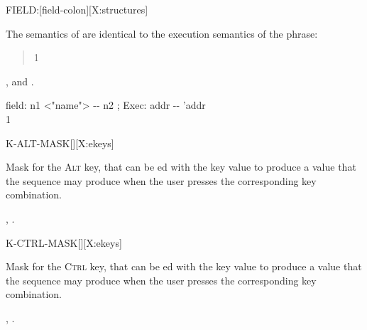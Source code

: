 \begin{worddef}{}{FIELD:}[field-colon][X:structures]
\item \stack{}{}

	The semantics of  are identical to the
	execution semantics of the phrase:
	\begin{quote}\ttfamily
		 1  
	\end{quote}

\see {},
	 and
	.

	\begin{defer}
	\implementation

		\word{:} field:\tab{} n1 <"name"> -{}- n2 ; Exec: addr -{}- 'addr \\
		\tab {} 1   \\
		\word{;}
	\end{defer}

\end{worddef}


\begin{worddef}{}{K-ALT-MASK}[][X:ekeys]
\item {}

	Mask for the \textsc{Alt} key, that can be ed with the
	key value to produce a value that the sequence 
	 may produce when the user presses the
	corresponding key combination.

\see {},
	.
\end{worddef}


\begin{worddef}{}{K-CTRL-MASK}[][X:ekeys]
\item {}

	Mask for the \textsc{Ctrl} key, that can be ed with the
	key value to produce a value that the sequence 
	 may produce when the user presses the
	corresponding key combination.

\see {},
	.
\end{worddef}


